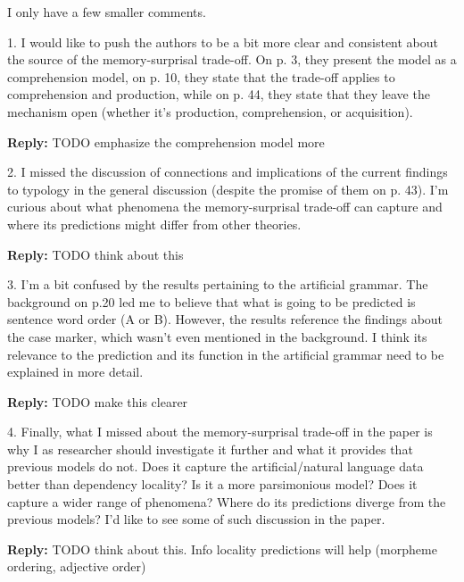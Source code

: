 \documentclass{article}[11pt,a4paper,oneside]
\newenvironment{reply}
  {\par\medskip
   \color{blue}%
   \begin{framed}
   \textbf{Reply: }\ignorespaces}
 {\end{framed}
  \medskip}
\begin{document}
I only have a few smaller comments.

1. I would like to push the authors to be a bit more clear and consistent about the source of the memory-surprisal trade-off. On p. 3, they present the model as a comprehension model, on p. 10, they state that the trade-off applies to comprehension and production, while on p. 44, they state that they leave the mechanism open (whether it's production, comprehension, or acquisition).

\begin{reply}
	TODO emphasize the comprehension model more
\end{reply}

2. I missed the discussion of connections and implications of the current findings to typology in the general discussion (despite the promise of them on p. 43). I'm curious about what phenomena the memory-surprisal trade-off can capture and where its predictions might differ from other theories.

\begin{reply}
	TODO think about this
\end{reply}

3. I'm a bit confused by the results pertaining to the artificial grammar. The background on p.20 led me to believe that what is going to be predicted is sentence word order (A or B). However, the results reference the findings about the case marker, which wasn't even mentioned in the background. I think its relevance to the prediction and its function in the artificial grammar need to be explained in more detail.

\begin{reply}
	TODO make this clearer
\end{reply}

4. Finally, what I missed about the memory-surprisal trade-off in the paper is why I as researcher should investigate it further and what it provides that previous models do not. Does it capture the artificial/natural language data better than dependency locality? Is it a more parsimonious model? Does it capture a wider range of phenomena? Where do its predictions diverge from the previous models? I'd like to see some of such discussion in the paper.

\begin{reply}
	TODO think about this. Info locality predictions will help (morpheme ordering, adjective order)
\end{reply}
\end{document}

